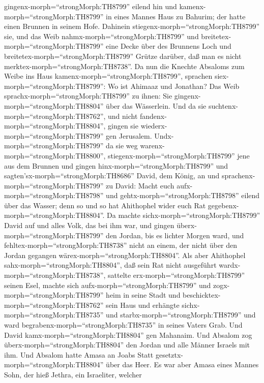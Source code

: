 gingenx-morph=``strongMorph:TH8799'' eilend hin und
kamenx-morph=``strongMorph:TH8799'' in eines Mannes Haus zu Bahurim; der
hatte einen Brunnen in seinem Hofe. Dahinein
stiegenx-morph=``strongMorph:TH8799'' sie,  und das Weib
nahmx-morph=``strongMorph:TH8799'' und
breitetex-morph=``strongMorph:TH8799'' eine Decke über des Brunnens Loch
und breitetex-morph=``strongMorph:TH8799'' Grütze darüber, daß man es
nicht merktex-morph=``strongMorph:TH8738''.  Da nun die
Knechte Absaloms zum Weibe ins Haus kamenx-morph=``strongMorph:TH8799'',
sprachen siex-morph=``strongMorph:TH8799'': Wo ist Ahimaaz und Jonathan?
Das Weib sprachx-morph=``strongMorph:TH8799'' zu ihnen: Sie
gingenx-morph=``strongMorph:TH8804'' über das Wässerlein. Und da sie
suchtenx-morph=``strongMorph:TH8762'', und nicht
fandenx-morph=``strongMorph:TH8804'', gingen sie
wiederx-morph=``strongMorph:TH8799'' gen Jerusalem. 
Undx-morph=``strongMorph:TH8799'' da sie weg
warenx-morph=``strongMorph:TH8800'',
stiegenx-morph=``strongMorph:TH8799'' jene aus dem Brunnen und gingen
hinx-morph=``strongMorph:TH8799'' und
sagten'sx-morph=``strongMorph:TH8686'' David, dem König, an und
sprachenx-morph=``strongMorph:TH8799'' zu David: Macht euch
aufx-morph=``strongMorph:TH8798'' und gehtx-morph=``strongMorph:TH8798''
eilend über das Wasser; denn so und so hat Ahithophel wider euch Rat
gegebenx-morph=``strongMorph:TH8804''.  Da machte
sichx-morph=``strongMorph:TH8799'' David auf und alles Volk, das bei ihm
war, und gingen überx-morph=``strongMorph:TH8799'' den Jordan, bis es
lichter Morgen ward, und fehltex-morph=``strongMorph:TH8738'' nicht an
einem, der nicht über den Jordan gegangen
wärex-morph=``strongMorph:TH8804''.  Als aber Ahithophel
sahx-morph=``strongMorph:TH8804'', daß sein Rat nicht ausgeführt
wardx-morph=``strongMorph:TH8738'', sattelte
erx-morph=``strongMorph:TH8799'' seinen Esel, machte sich
aufx-morph=``strongMorph:TH8799'' und zogx-morph=``strongMorph:TH8799''
heim in seine Stadt und beschicktex-morph=``strongMorph:TH8762'' sein
Haus und erhängte sichx-morph=``strongMorph:TH8735'' und
starbx-morph=``strongMorph:TH8799'' und ward
begrabenx-morph=``strongMorph:TH8735'' in seines Vaters Grab.
 Und David kamx-morph=``strongMorph:TH8804'' gen Mahanaim.
Und Absalom zog überx-morph=``strongMorph:TH8804'' den Jordan und alle
Männer Israels mit ihm.  Und Absalom hatte Amasa an Joabs
Statt gesetztx-morph=``strongMorph:TH8804'' über das Heer. Es war aber
Amasa eines Mannes Sohn, der hieß Jethra, ein Israeliter, welcher
